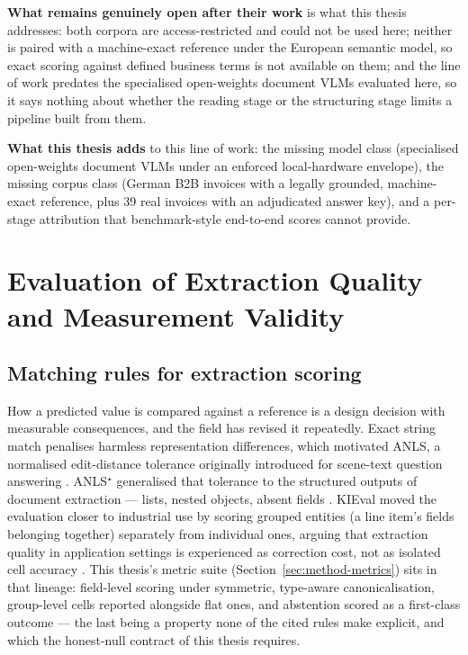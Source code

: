 \textbf{What remains genuinely open after their work} is what this thesis addresses: both
corpora are access-restricted and could not be used here; neither is paired with a
machine-exact reference under the European semantic model, so exact scoring against defined
business terms is not available on them; and the line of work predates the specialised
open-weights document \acp{VLM} evaluated here, so it says nothing about whether the
reading stage or the structuring stage limits a pipeline built from them.

\textbf{What this thesis adds} to this line of work: the missing model class (specialised
open-weights document \acp{VLM} under an enforced local-hardware envelope), the missing
corpus class (German \ac{B2B} invoices with a legally grounded, machine-exact reference,
plus 39 real invoices with an adjudicated answer key), and a per-stage attribution that
benchmark-style end-to-end scores cannot provide.

\section{Evaluation of Extraction Quality and Measurement Validity}
\label{sec:rw-evaluation}

\subsection{Matching rules for extraction scoring}

How a predicted value is compared against a reference is a design decision with measurable
consequences, and the field has revised it repeatedly. Exact string match penalises
harmless representation differences, which motivated \ac{ANLS}, a normalised edit-distance
tolerance originally introduced for scene-text question answering \parencite{biten2019anls}.
ANLS$^{\star}$ generalised that tolerance to the structured outputs of document extraction
--- lists, nested objects, absent fields \parencite{peer2024anlsstar}. KIEval moved the
evaluation closer to industrial use by scoring grouped entities (a line item's fields
belonging together) separately from individual ones, arguing that extraction quality in
application settings is experienced as correction cost, not as isolated cell accuracy
\parencite{kieval2025}. This thesis's metric suite (Section~\ref{sec:method-metrics}) sits in that
lineage: field-level scoring under symmetric, type-aware canonicalisation, group-level
cells reported alongside flat ones, and abstention scored as a first-class outcome ---
the last being a property none of the cited rules make explicit, and which the honest-null
contract of this thesis requires.

